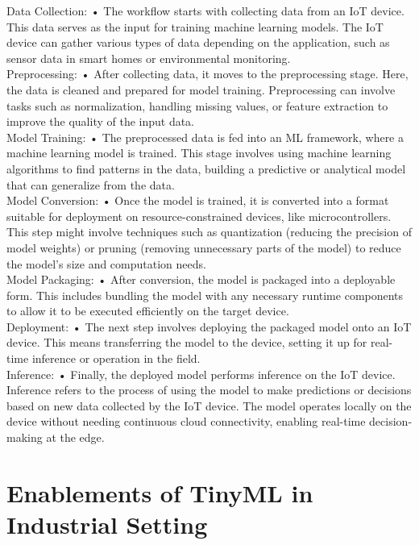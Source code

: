 \documentclass[twocolumn]{article}
\begin{document}
Data Collection:
	•	The workflow starts with collecting data from an IoT device. This data serves as the input for training machine learning models. The IoT device can gather various types of data depending on the application, such as sensor data in smart homes or environmental monitoring. \\[0.25cm]
Preprocessing:
	•	After collecting data, it moves to the preprocessing stage. Here, the data is cleaned and prepared for model training. Preprocessing can involve tasks such as normalization, handling missing values, or feature extraction to improve the quality of the input data.\\[0.25cm]
Model Training:
	•	The preprocessed data is fed into an ML framework, where a machine learning model is trained. This stage involves using machine learning algorithms to find patterns in the data, building a predictive or analytical model that can generalize from the data.\\[0.25cm]
Model Conversion:
	•	Once the model is trained, it is converted into a format suitable for deployment on resource-constrained devices, like microcontrollers. This step might involve techniques such as quantization (reducing the precision of model weights) or pruning (removing unnecessary parts of the model) to reduce the model’s size and computation needs.\\[0.25cm]
Model Packaging:
	•	After conversion, the model is packaged into a deployable form. This includes bundling the model with any necessary runtime components to allow it to be executed efficiently on the target device.\\[0.25cm]
Deployment:
	•	The next step involves deploying the packaged model onto an IoT device. This means transferring the model to the device, setting it up for real-time inference or operation in the field.\\[0.25cm]
Inference:
	•	Finally, the deployed model performs inference on the IoT device. Inference refers to the process of using the model to make predictions or decisions based on new data collected by the IoT device. The model operates locally on the device without needing continuous cloud connectivity, enabling real-time decision-making at the edge.\\[0.25cm]



\section{Enablements of TinyML in Industrial Setting}
\label{prod_tinyml}
\end{document}

